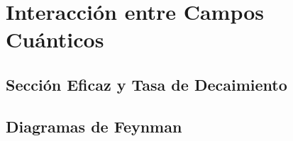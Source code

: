 \chapter{Interacción entre Campos Cuánticos}

\section{Sección Eficaz y Tasa de Decaimiento}

\section{Diagramas de Feynman}

\newpage




